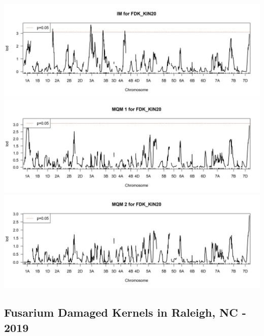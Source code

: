 \documentclass[
]{article}
\begin{document}
\includegraphics{Scan_IM_FDK_KIN20.jpg}
\includegraphics{Scan_MQM1_FDK_KIN20.jpg}
\includegraphics{Scan_MQM2_FDK_KIN20.jpg} \pagebreak

\subsection{Fusarium Damaged Kernels in Raleigh, NC -
2019}\label{fusarium-damaged-kernels-in-raleigh-nc---2019}
\end{document}
